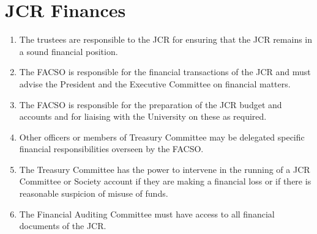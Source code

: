 \documentclass[12pt]{article}
\begin{document}
\section{JCR Finances}
\begin{enumerate}
    \item The trustees are responsible to the JCR for ensuring that the JCR remains in a sound financial position.
    \item The FACSO is responsible for the financial transactions of the JCR and must advise the President and the Executive Committee on financial matters.
    \item The FACSO is responsible for the preparation of the JCR budget and accounts and for liaising with the University on these as required.
    \item Other officers or members of Treasury Committee may be delegated specific financial responsibilities overseen by the FACSO.
    \item The Treasury Committee has the power to intervene in the running of a JCR Committee or Society account if they are making a financial loss or if there is reasonable suspicion of misuse of funds.
    \item The Financial Auditing Committee must have access to all financial documents of the JCR.
\end{enumerate}
\newpage
\end{document}
